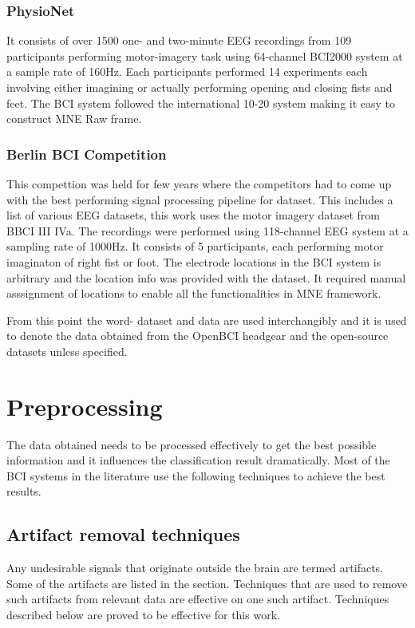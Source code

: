 \subsubsection{PhysioNet}
    It consists of over 1500 one- and two-minute EEG recordings from 109 participants performing motor-imagery task using 64-channel BCI2000 system at a sample rate of 160Hz.
Each participants performed 14 experiments each involving either imagining or actually performing opening and closing fists and feet. The BCI system followed the international
10-20 system making it easy to construct MNE Raw frame.

\subsubsection{Berlin BCI Competition}
    This compettion was held for few years where the competitors had to come up with the best performing signal processing pipeline for dataset. This includes a list of various
EEG datasets, this work uses the motor imagery dataset from BBCI III IVa. The recordings were performed using 118-channel EEG system at a sampling rate of 1000Hz. It consists
of 5 participants, each performing motor imaginaton of right fist or foot. The electrode locations in the BCI system is arbitrary and the location info was provided with the dataset.
It required manual asssignment of locations to enable all the functionalities in MNE framework.

From this point the word- dataset and data are used interchangibly and it is used to denote the data obtained from the OpenBCI headgear and the open-source datasets unless specified.

\section{Preprocessing}
The data obtained needs to be processed effectively to get the best possible information and it influences the classification result dramatically. Most of the BCI systems in the
literature use the following techniques to achieve the best results. 

\subsection{Artifact removal techniques}
    Any undesirable signals that originate outside the brain  are termed artifacts. Some of the artifacts are listed in the section. Techniques that are used to remove such
artifacts from relevant data are effective on one such artifact. Techniques described below are proved to be effective for this work. 

